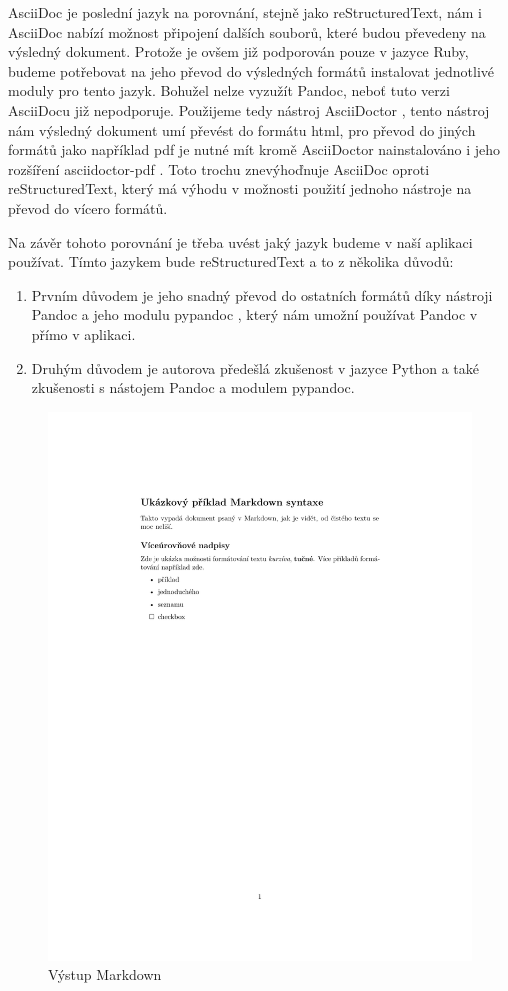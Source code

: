 AsciiDoc je poslední jazyk na porovnání, stejně jako reStructuredText, nám i AsciiDoc nabízí možnost připojení dalších souborů, které budou převedeny na výsledný dokument.
Protože je ovšem již podporován pouze v jazyce Ruby, budeme potřebovat na jeho převod do výsledných formátů instalovat jednotlivé moduly pro tento jazyk. Bohužel nelze
vyzužít Pandoc, neboť tuto verzi AsciiDocu již nepodporuje. Použijeme tedy nástroj AsciiDoctor \cite{asciiDoctorSW}, tento nástroj nám výsledný dokument umí převést do
formátu \gls{html}, pro převod do jiných formátů jako například \gls{pdf} je nutné mít kromě AsciiDoctor nainstalováno i jeho rozšíření asciidoctor-pdf \cite{asciidoctorpdfSW}.
Toto trochu znevýhoďnuje AsciiDoc oproti reStructuredText, který má výhodu v možnosti použití jednoho nástroje na převod do vícero formátů.

Na závěr tohoto porovnání je třeba uvést jaký jazyk budeme v naší aplikaci používat. Tímto jazykem bude reStructuredText a to z několika důvodů:
\begin{enumerate}
    \item Prvním důvodem je jeho snadný převod do ostatních formátů díky nástroji Pandoc \cite{pandocSW} a jeho modulu pypandoc \cite{pypandocSW}, který nám umožní používat Pandoc v přímo v aplikaci.
    \item Druhým důvodem je autorova předešlá zkušenost v jazyce Python a také zkušenosti s nástojem Pandoc a modulem pypandoc.
\end{enumerate}

\begin{figure}[h]
    \centering
    \includegraphics[width=\textwidth]{example.pdf}
    \caption{Výstup Markdown}
    \label{fig:markdown}
\end{figure}

